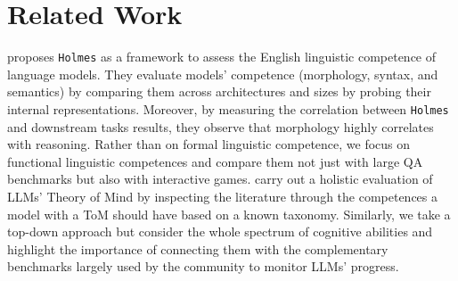 \section{Related Work}
\label{sec:related}

 \citet{waldis:holmes24} proposes {\tt Holmes} as a framework to assess the English linguistic competence of language models. They evaluate models' competence (morphology, syntax, and semantics) by comparing them across architectures and sizes by probing their internal representations. %
Moreover, by measuring the correlation between {\tt Holmes} and downstream tasks results, they observe that morphology highly correlates with reasoning. Rather than on formal linguistic competence, we focus on functional linguistic competences and compare them not just with large QA benchmarks but also with interactive games.
\citet{ma-etal-2023-towards-holistic} carry out a holistic evaluation of LLMs' Theory of Mind by inspecting the literature through the competences a model with a ToM should have based on a known taxonomy. 
Similarly, we take a top-down approach but consider the whole spectrum of cognitive abilities and highlight the importance of connecting them with the complementary benchmarks largely used by the community to monitor LLMs' progress.





